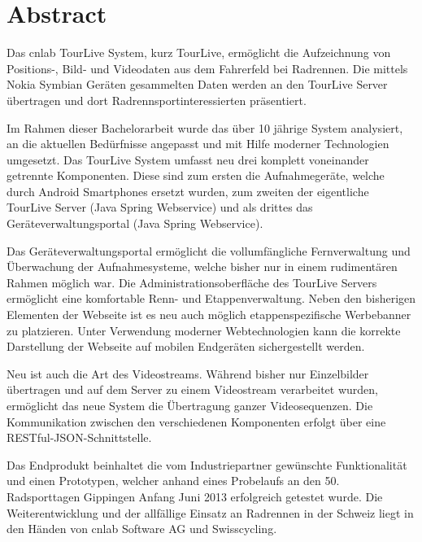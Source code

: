 \chapter*{Abstract}
Das cnlab TourLive System, kurz TourLive, ermöglicht die Aufzeichnung von Positions-, Bild- und Videodaten aus dem Fahrerfeld bei Radrennen. Die mittels Nokia Symbian Geräten gesammelten Daten werden an den TourLive Server übertragen und dort Radrennsportinteressierten präsentiert.



Im Rahmen dieser Bachelorarbeit wurde das über 10 jährige System analysiert, an die aktuellen Bedürfnisse angepasst und mit Hilfe moderner Technologien umgesetzt. Das TourLive System umfasst neu drei komplett voneinander getrennte Komponenten. Diese sind zum ersten die Aufnahmegeräte, welche durch Android Smartphones ersetzt wurden, zum zweiten der eigentliche TourLive Server (Java Spring Webservice) und als drittes das Geräteverwaltungsportal (Java Spring Webservice). 


Das Geräteverwaltungsportal ermöglicht die vollumfängliche Fernverwaltung und Überwachung der Aufnahmesysteme, welche bisher nur in einem rudimentären Rahmen möglich war. Die Administrationsoberfläche des TourLive Servers ermöglicht eine komfortable Renn- und Etappenverwaltung. Neben den bisherigen Elementen der Webseite ist es neu auch möglich etappenspezifische Werbebanner zu platzieren. Unter Verwendung moderner Webtechnologien kann die korrekte  Darstellung der Webseite auf mobilen Endgeräten sichergestellt werden.


Neu ist auch die Art des Videostreams. Während bisher nur Einzelbilder übertragen und auf dem Server zu einem Videostream verarbeitet wurden, ermöglicht das neue System die Übertragung ganzer Videosequenzen. Die Kommunikation zwischen den verschiedenen Komponenten erfolgt über eine  RESTful-JSON-Schnittstelle. 


Das Endprodukt beinhaltet die vom Industriepartner gewünschte Funktionalität und einen Prototypen, welcher anhand eines Probelaufs an den 50. Radsporttagen Gippingen Anfang Juni 2013 erfolgreich getestet wurde. Die Weiterentwicklung und der allfällige Einsatz an Radrennen in der Schweiz liegt in den Händen  von cnlab Software AG und Swisscycling.